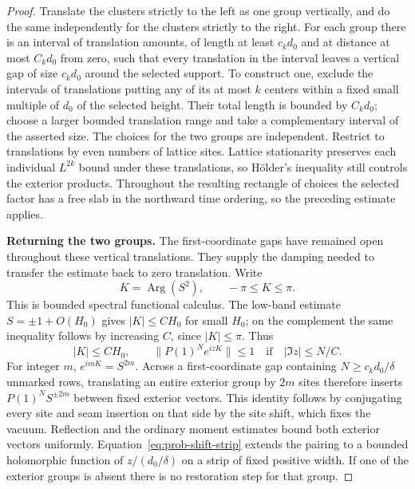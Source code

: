 \begin{proof}
Translate the clusters strictly to the left as one group vertically,
and do the same independently for the clusters strictly to the right.
For each group there is an interval of translation amounts, of length
at least \(c_kd_0\) and at distance at most \(C_kd_0\) from zero, such
that every translation in the interval leaves a vertical gap of size
\(c_kd_0\) around the selected support. To construct one, exclude the
intervals of translations putting any of its at most \(k\) centers
within a fixed small multiple of \(d_0\) of the selected height.
Their total length is bounded by \(C_kd_0\); choose a larger bounded
translation range and take a complementary interval of the asserted
size. The choices for the two groups are independent. Restrict to
translations by even numbers of lattice sites. Lattice stationarity
preserves each individual \(L^{2k}\) bound under these translations,
so Hölder's inequality still controls the exterior products.
Throughout the resulting rectangle of choices the selected factor has a free slab in the
northward time ordering, so the preceding estimate applies.

\smallskip\noindent\textbf{Returning the two groups.}
The first-coordinate gaps have remained open throughout these vertical
translations. They supply the damping needed to transfer the estimate
back to zero translation. Write
\[
 K=\operatorname{Arg}(S^2),\qquad -\pi\le K\le\pi.
\]
This is bounded spectral functional calculus. The low-band estimate
\(S=\pm1+O(H_0)\) gives \(|K|\le CH_0\) for small \(H_0\); on the
complement the same inequality follows by increasing \(C\), since
\(|K|\le\pi\). Thus
\begin{equation}\label{eq:prob-shift-strip}
 |K|\le CH_0,
 \qquad
 \|P(1)^N e^{izK}\|\le1
       \quad\text{if}\quad |\Im z|\le N/C.
\end{equation}
For integer \(m\), \(e^{imK}=S^{2m}\).
Across a first-coordinate gap containing \(N\ge c_kd_0/\delta\)
unmarked rows, translating an entire exterior group by \(2m\) sites
therefore inserts \(P(1)^NS^{\pm2m}\) between fixed exterior vectors.
This identity follows by conjugating every site and seam insertion
on that side by the site shift, which fixes the vacuum. Reflection and
the ordinary moment estimates bound both exterior vectors uniformly.
Equation~\eqref{eq:prob-shift-strip} extends the pairing to a bounded
holomorphic function of \(z/(d_0/\delta)\) on a strip of fixed positive
width. If one of the exterior groups is absent there is no restoration
step for that group.


\end{proof}
